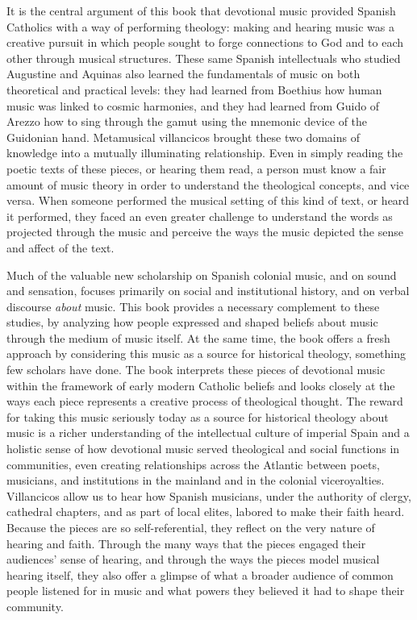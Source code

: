 It is the central argument of this book that devotional music provided Spanish
Catholics with a way of performing theology: making and hearing music was a
creative pursuit in which people sought to forge connections to God and to each
other through musical structures.
These same Spanish intellectuals who studied Augustine and Aquinas also learned
the fundamentals of music on both theoretical and practical levels: they had
learned from Boethius how human music was linked to cosmic harmonies, and they
had learned from Guido of Arezzo how to sing through the gamut using the
mnemonic device of the Guidonian hand.
Metamusical villancicos brought these two domains of knowledge into a mutually
illuminating relationship.
Even in simply reading the poetic texts of these pieces, or hearing them read,
a person must know a fair amount of music theory in order to understand the
theological concepts, and vice versa.
When someone performed the musical setting of this kind of text, or heard it
performed, they faced an even greater challenge to understand the words as
projected through the music and perceive the ways the music depicted the sense
and affect of the text. 

Much of the valuable new scholarship on Spanish colonial music, and on sound and
sensation, focuses primarily on social and institutional history, and on verbal
discourse \emph{about} music.%
    \Autocites{Baker:Harmony}{BakerKnighton:MusicUrbanSociety}{Irving:Colonial} 
    {RamosKittrell:PlayingCathedral}{DellAntonio:Listening}
This book provides a necessary complement to these studies, by analyzing how
people expressed and shaped beliefs about music through the medium of music
itself.
At the same time, the book offers a fresh approach by considering this music as
a source for historical theology, something few scholars have done.
The book interprets these pieces of devotional music within the framework of
early modern Catholic beliefs and looks closely at the ways each piece
represents a creative process of theological thought.
The reward for taking this music seriously today as a source for historical
theology about music is a richer understanding of the intellectual culture of
imperial Spain and a holistic sense of how devotional music served theological
and social functions in communities, even creating relationships across the
Atlantic between poets, musicians, and institutions in the mainland and in
the colonial viceroyalties.
Villancicos allow us to hear how Spanish musicians, under the authority of
clergy, cathedral chapters, and as part of local elites, labored to make their
faith heard.
Because the pieces are so self-referential, they reflect on the very nature of
hearing and faith.
Through the many ways that the pieces engaged their audiences' sense of hearing,
and through the ways the pieces model musical hearing itself, they also offer a
glimpse of what a broader audience of common people listened for in music and
what powers they believed it had to shape their community.

